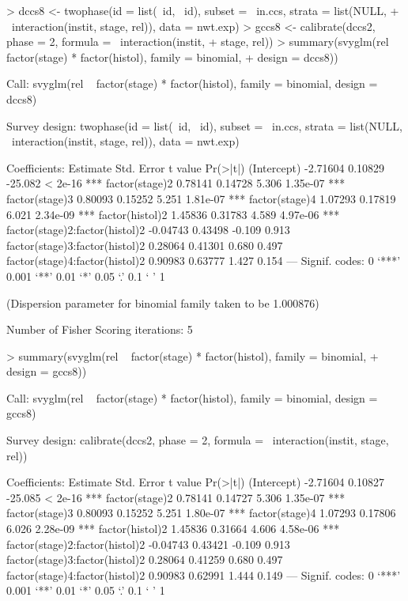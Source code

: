 \documentclass{article}
\begin{document}
\begin{Schunk}
\begin{Sinput}
> dccs8 <- twophase(id = list(~id, ~id), subset = ~in.ccs, strata = list(NULL, 
+     ~interaction(instit, stage, rel)), data = nwt.exp)
> gccs8 <- calibrate(dccs2, phase = 2, formula = ~interaction(instit, 
+     stage, rel))
> summary(svyglm(rel ~ factor(stage) * factor(histol), family = binomial, 
+     design = dccs8))
\end{Sinput}
\begin{Soutput}
Call:
svyglm(rel ~ factor(stage) * factor(histol), family = binomial, 
    design = dccs8)

Survey design:
twophase(id = list(~id, ~id), subset = ~in.ccs, strata = list(NULL, 
    ~interaction(instit, stage, rel)), data = nwt.exp)

Coefficients:
                               Estimate Std. Error t value Pr(>|t|)    
(Intercept)                    -2.71604    0.10829 -25.082  < 2e-16 ***
factor(stage)2                  0.78141    0.14728   5.306 1.35e-07 ***
factor(stage)3                  0.80093    0.15252   5.251 1.81e-07 ***
factor(stage)4                  1.07293    0.17819   6.021 2.34e-09 ***
factor(histol)2                 1.45836    0.31783   4.589 4.97e-06 ***
factor(stage)2:factor(histol)2 -0.04743    0.43498  -0.109    0.913    
factor(stage)3:factor(histol)2  0.28064    0.41301   0.680    0.497    
factor(stage)4:factor(histol)2  0.90983    0.63777   1.427    0.154    
---
Signif. codes:  0 ‘***’ 0.001 ‘**’ 0.01 ‘*’ 0.05 ‘.’ 0.1 ‘ ’ 1 

(Dispersion parameter for binomial family taken to be 1.000876)

Number of Fisher Scoring iterations: 5
\end{Soutput}
\begin{Sinput}
> summary(svyglm(rel ~ factor(stage) * factor(histol), family = binomial, 
+     design = gccs8))
\end{Sinput}
\begin{Soutput}
Call:
svyglm(rel ~ factor(stage) * factor(histol), family = binomial, 
    design = gccs8)

Survey design:
calibrate(dccs2, phase = 2, formula = ~interaction(instit, stage, 
    rel))

Coefficients:
                               Estimate Std. Error t value Pr(>|t|)    
(Intercept)                    -2.71604    0.10827 -25.085  < 2e-16 ***
factor(stage)2                  0.78141    0.14727   5.306 1.35e-07 ***
factor(stage)3                  0.80093    0.15252   5.251 1.80e-07 ***
factor(stage)4                  1.07293    0.17806   6.026 2.28e-09 ***
factor(histol)2                 1.45836    0.31664   4.606 4.58e-06 ***
factor(stage)2:factor(histol)2 -0.04743    0.43421  -0.109    0.913    
factor(stage)3:factor(histol)2  0.28064    0.41259   0.680    0.497    
factor(stage)4:factor(histol)2  0.90983    0.62991   1.444    0.149    
---
Signif. codes:  0 ‘***’ 0.001 ‘**’ 0.01 ‘*’ 0.05 ‘.’ 0.1 ‘ ’ 1 


\end{Soutput}
\end{Schunk}
\end{document}
